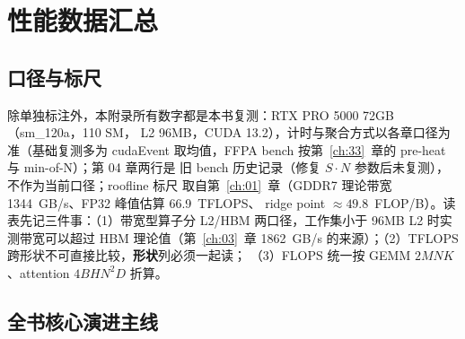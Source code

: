 \chapter{性能数据汇总}\label{app:B}

\section{口径与标尺}

除单独标注外，本附录所有数字都是本书复测：RTX PRO 5000 72GB（sm\_120a，110 SM，
L2 96MB，CUDA 13.2），计时与聚合方式以各章口径为准（基础复测多为 cudaEvent
取均值，FFPA bench 按第~\ref{ch:33}~章的 pre-heat 与 min-of-N）；第 04 章两行是
旧 bench 历史记录（修复 $S\cdot N$ 参数后未复测），不作为当前口径；roofline 标尺
取自第~\ref{ch:01}~章（GDDR7 理论带宽 1344~GB/s、FP32 峰值估算 66.9~TFLOPS、
ridge point $\approx 49.8$~FLOP/B）。读表先记三件事：（1）带宽型算子分 L2/HBM
两口径，工作集小于 96MB L2 时实测带宽可以超过 HBM 理论值（第~\ref{ch:03}~章
1862~GB/s 的来源）；（2）TFLOPS 跨形状不可直接比较，\textbf{形状}列必须一起读；
（3）FLOPS 统一按 GEMM $2MNK$、attention $4BHN^2D$ 折算。

\section{全书核心演进主线}

